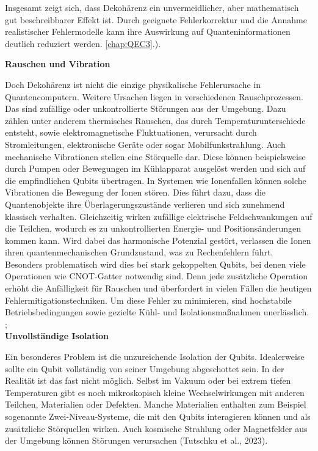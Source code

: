 Insgesamt zeigt sich, dass Dekohärenz  ein unvermeidlicher, aber mathematisch gut beschreibbarer Effekt ist. Durch geeignete Fehlerkorrektur und die Annahme realistischer Fehlermodelle kann ihre Auswirkung auf Quanteninformationen deutlich reduziert werden. \ref{chap:QEC3}.). \cite[Seite 332-339]{rieffel_eleanor_g_and_wolfgang_h_polak_quantum_2011}


\textbf{Rauschen und Vibration}

Doch Dekohärenz ist nicht die einzige physikalische Fehlerursache in Quantencomputern. Weitere Ursachen liegen in verschiedenen Rauschprozessen. Das sind zufällige oder unkontrollierte Störungen aus der Umgebung. Dazu zählen unter anderem thermisches Rauschen, das durch Temperaturunterschiede entsteht, sowie elektromagnetische Fluktuationen, verursacht durch Stromleitungen, elektronische Geräte oder sogar Mobilfunkstrahlung. Auch mechanische Vibrationen stellen eine Störquelle dar. Diese können beispielsweise durch Pumpen oder Bewegungen im Kühlapparat ausgelöst werden und sich auf die empfindlichen Qubits übertragen. In Systemen wie Ionenfallen können solche Vibrationen die Bewegung der Ionen stören. Dies führt dazu, dass die Quantenobjekte ihre Überlagerungszustände verlieren und sich zunehmend klassisch verhalten. Gleichzeitig wirken zufällige elektrische Feldschwankungen auf die Teilchen, wodurch es zu unkontrollierten Energie- und Positionsänderungen kommen kann. Wird dabei das harmonische Potenzial gestört, verlassen die Ionen ihren quantenmechanischen Grundzustand, was zu Rechenfehlern führt. Besonders problematisch wird dies bei stark gekoppelten Qubits, bei denen viele Operationen wie CNOT-Gatter notwendig sind. Denn jede zusätzliche Operation erhöht die Anfälligkeit für Rauschen und überfordert in vielen Fällen die heutigen Fehlermitigationstechniken. Um diese Fehler zu minimieren, sind hochstabile Betriebsbedingungen sowie gezielte Kühl- und Isolationsmaßnahmen unerlässlich.\cite[Seite 39-43]{tutschku_quantencomputing_2023}\\;  \cite[Seite 353-356]{nielsen_quantum_2010}\\


\textbf{Unvollständige Isolation}

Ein besonderes Problem ist die unzureichende Isolation der Qubits. Idealerweise sollte ein Qubit vollständig von seiner Umgebung abgeschottet sein. In der Realität ist das fast nicht möglich. Selbst im Vakuum oder bei extrem tiefen Temperaturen gibt es noch mikroskopisch kleine Wechselwirkungen mit anderen Teilchen, Materialien oder Defekten. Manche Materialien enthalten zum Beispiel sogenannte Zwei-Niveau-Systeme, die mit den Qubits interagieren können und als zusätzliche Störquellen wirken. Auch kosmische Strahlung oder Magnetfelder aus der Umgebung können Störungen verursachen (Tutschku et al., 2023).

